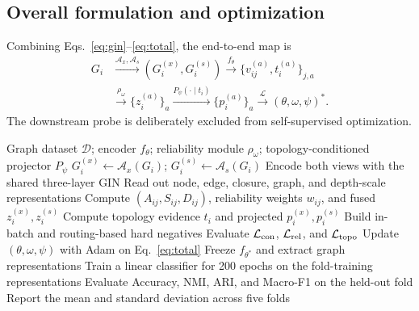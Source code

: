 \documentclass[10pt,twocolumn]{article}
\begin{document}
\subsection{Overall formulation and optimization}

Combining Eqs.~\eqref{eq:gin}--\eqref{eq:total}, the end-to-end map is
\begin{equation}
\begin{aligned}
G_i &\xrightarrow{\mathcal A_x,\mathcal A_s}
(G_i^{(x)},G_i^{(s)})
\xrightarrow{f_\theta}
\{v_{ij}^{(a)},t_i^{(a)}\}_{j,a}\\
&\xrightarrow{\rho_\omega}
\{z_i^{(a)}\}_{a}
\xrightarrow{P_{\psi}(\cdot\mid t_i)}
\{p_i^{(a)}\}_{a}
\xrightarrow{\mathcal L}
(\theta,\omega,\psi)^*.
\end{aligned}
\end{equation}
The downstream probe is deliberately excluded from self-supervised optimization.

\begin{algorithm}[t]
\caption{End-to-end pretraining and linear-probe evaluation}
\label{alg:training}
\begin{algorithmic}[1]
\Require Graph dataset $\mathcal D$; encoder $f_\theta$; reliability module $\rho_\omega$; topology-conditioned projector $P_\psi$
            \State $G_i^{(x)}\gets\mathcal A_x(G_i)$; $G_i^{(s)}\gets\mathcal A_s(G_i)$
            \State Encode both views with the shared three-layer GIN
            \State Read out node, edge, closure, graph, and depth-scale representations
            \State Compute $(A_{ij},S_{ij},D_{ij})$, reliability weights $w_{ij}$, and fused $z_i^{(x)},z_i^{(s)}$
            \State Compute topology evidence $t_i$ and projected $p_i^{(x)},p_i^{(s)}$
        \EndFor
        \State Build in-batch and routing-based hard negatives
        \State Evaluate $\mathcal L_{\rm con}$, $\mathcal L_{\rm rel}$, and $\mathcal L_{\rm topo}$
        \State Update $(\theta,\omega,\psi)$ with Adam on Eq.~\eqref{eq:total}
    \EndFor
\EndFor
\State Freeze $f_{\theta^*}$ and extract graph representations
    \State Train a linear classifier for 200 epochs on the fold-training representations
    \State Evaluate Accuracy, NMI, ARI, and Macro-F1 on the held-out fold
\EndFor
\State Report the mean and standard deviation across five folds
\end{algorithmic}
\end{algorithm}
\end{document}
